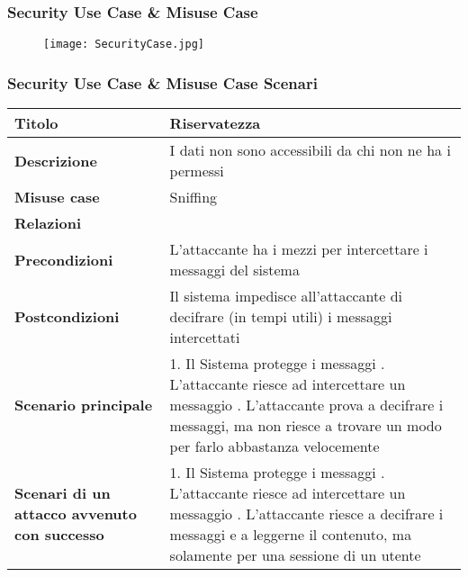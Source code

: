 \newpage
\subsubsection{Security Use Case \& Misuse Case}
\par

\begin{figure}[h!]
  \begin{center}
      \texttt{[image: SecurityCase.jpg]}
  \end{center}
\end{figure}
\newpage


\subsubsection{Security Use Case \& Misuse Case Scenari}
\hfill

\begin{tabular} {|P{4cm}|P{13cm}|}
\hline
  \textbf{Titolo} & Riservatezza\\
\hline
  \textbf{Descrizione} & I dati non sono accessibili da chi non ne ha i permessi\\
\hline
  \textbf{Misuse case} & Sniffing\\
\hline
  \textbf{Relazioni} &\\
\hline
  \textbf{Precondizioni} & L'attaccante ha i mezzi per intercettare i messaggi del sistema\\
\hline
  \textbf{Postcondizioni} & Il sistema impedisce all'attaccante di decifrare
  (in tempi utili) i messaggi intercettati\\
\hline
  \textbf{Scenario principale} & 1. Il Sistema protegge i messaggi . L'attaccante riesce ad intercettare un messaggio . L'attaccante prova
  a decifrare i messaggi, ma non riesce a trovare un modo per farlo abbastanza
  velocemente\\
\hline
  \textbf{Scenari di un attacco avvenuto con successo} & 1. Il Sistema protegge
  i messaggi . L'attaccante riesce ad intercettare un messaggio . L'attaccante riesce a decifrare i messaggi e a leggerne il contenuto, ma
  solamente per una sessione di un utente\\
\hline
\end{tabular}

\hfill
\break

